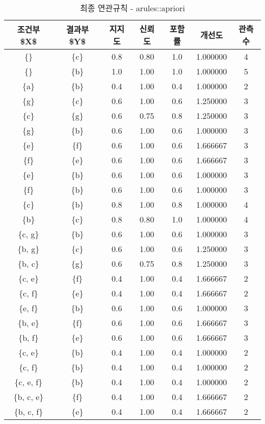\documentclass[
]{book}
\begin{document}
\begin{table}

\caption{\label{tab:apriori-r-results}최종 연관규칙 - arules::apriori}
\centering
\begin{tabular}[t]{ccccccc}
\toprule
조건부 \$X\$ & 결과부 \$Y\$ & 지지도 & 신뢰도 & 포함률 & 개선도 & 관측수\\
\midrule
\{\} & \{c\} & 0.8 & 0.80 & 1.0 & 1.000000 & 4\\
\{\} & \{b\} & 1.0 & 1.00 & 1.0 & 1.000000 & 5\\
\{a\} & \{b\} & 0.4 & 1.00 & 0.4 & 1.000000 & 2\\
\{g\} & \{c\} & 0.6 & 1.00 & 0.6 & 1.250000 & 3\\
\{c\} & \{g\} & 0.6 & 0.75 & 0.8 & 1.250000 & 3\\
\addlinespace
\{g\} & \{b\} & 0.6 & 1.00 & 0.6 & 1.000000 & 3\\
\{e\} & \{f\} & 0.6 & 1.00 & 0.6 & 1.666667 & 3\\
\{f\} & \{e\} & 0.6 & 1.00 & 0.6 & 1.666667 & 3\\
\{e\} & \{b\} & 0.6 & 1.00 & 0.6 & 1.000000 & 3\\
\{f\} & \{b\} & 0.6 & 1.00 & 0.6 & 1.000000 & 3\\
\addlinespace
\{c\} & \{b\} & 0.8 & 1.00 & 0.8 & 1.000000 & 4\\
\{b\} & \{c\} & 0.8 & 0.80 & 1.0 & 1.000000 & 4\\
\{c, g\} & \{b\} & 0.6 & 1.00 & 0.6 & 1.000000 & 3\\
\{b, g\} & \{c\} & 0.6 & 1.00 & 0.6 & 1.250000 & 3\\
\{b, c\} & \{g\} & 0.6 & 0.75 & 0.8 & 1.250000 & 3\\
\addlinespace
\{c, e\} & \{f\} & 0.4 & 1.00 & 0.4 & 1.666667 & 2\\
\{c, f\} & \{e\} & 0.4 & 1.00 & 0.4 & 1.666667 & 2\\
\{e, f\} & \{b\} & 0.6 & 1.00 & 0.6 & 1.000000 & 3\\
\{b, e\} & \{f\} & 0.6 & 1.00 & 0.6 & 1.666667 & 3\\
\{b, f\} & \{e\} & 0.6 & 1.00 & 0.6 & 1.666667 & 3\\
\addlinespace
\{c, e\} & \{b\} & 0.4 & 1.00 & 0.4 & 1.000000 & 2\\
\{c, f\} & \{b\} & 0.4 & 1.00 & 0.4 & 1.000000 & 2\\
\{c, e, f\} & \{b\} & 0.4 & 1.00 & 0.4 & 1.000000 & 2\\
\{b, c, e\} & \{f\} & 0.4 & 1.00 & 0.4 & 1.666667 & 2\\
\{b, c, f\} & \{e\} & 0.4 & 1.00 & 0.4 & 1.666667 & 2\\
\bottomrule
\end{tabular}
\end{table}
\end{document}
